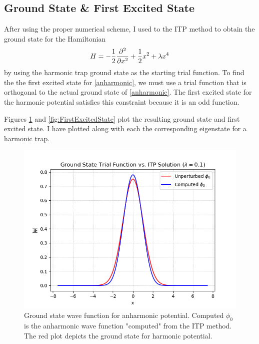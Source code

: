 \documentclass[onecolumn,english,aps,pra]{revtex4}
\begin{document}
\subsection*{Ground State \& First Excited State}
After using the proper numerical scheme, I used to the ITP method to obtain the ground state for the Hamiltonian
\begin{equation}
H =  -\frac{1}{2} \pdv[2]{}{x} + \frac{1}{2} x^2 + \lambda x^4 
\label{anharmonic}
\end{equation}
by using the harmonic trap ground state as the starting trial function. To find the the  first excited state for \ref{anharmonic}, we must use a trial function that is orthogonal to the actual ground state of \ref{anharmonic}. The first excited state for the harmonic potential satisfies this constraint because it is an odd function.

Figures \ref{fig:GroundState} and \ref{fig:FirstExcitedState} plot the resulting ground state and first excited state. I have plotted along with each the corresponding eigenstate for a harmonic trap.

\begin{figure}[H]
\center
\includegraphics[scale=0.7]{../Plots/Anharmonic/GroundState}
\caption{Ground state wave function for anharmonic potential. Computed $\phi_0$ is the anharmonic wave function "computed" from the ITP method. The red plot depicts the ground state for harmonic potential.}
\label{fig:GroundState}
\end{figure}
\end{document}
